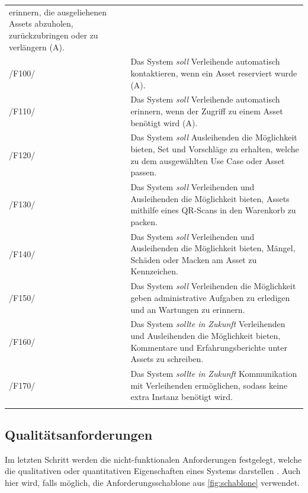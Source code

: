 \begin{center}
\begin{longtable}{lp{}}
                 erinnern, die ausgeliehenen Assets abzuholen, zurückzubringen oder zu verlängern
                 (A). \\
                 \sffamily\color{maincolor}/F100/  & Das System \textit{soll} Verleihende automatisch
                 kontaktieren, wenn ein Asset reserviert wurde (A). \\
                 \sffamily\color{maincolor}/F110/  & Das System \textit{soll} Verleihende automatisch
                 erinnern, wenn der Zugriff zu einem Asset benötigt wird (A). \\
                 \sffamily\color{maincolor}/F120/  & Das System \textit{soll} Ausleihenden die
                 Möglichkeit bieten, Set und Vorschläge zu erhalten, welche zu dem ausgewählten Use
                 Case oder Asset passen. \\
                 \sffamily\color{maincolor}/F130/ & Das System \textit{soll} Verleihenden und
                 Ausleihenden die Möglichkeit bieten, Assets mithilfe eines QR-Scans in den
                 Warenkorb zu packen. \\
                 \sffamily\color{maincolor}/F140/  & Das System \textit{soll} Verleihenden und
                 Ausleihenden die Möglichkeit bieten, Mängel, Schäden oder Macken am Asset zu
                 Kennzeichen. \\
                 \sffamily\color{maincolor}/F150/ & Das System \textit{soll} Verleihenden die
                 Möglichkeit geben administrative Aufgaben zu erledigen und an Wartungen zu erinnern.\\
                 \sffamily\color{maincolor}/F160/  & Das System \textit{sollte in Zukunft}
                 Verleihenden und Ausleihenden die Möglichkeit bieten, Kommentare und
                 Erfahrungsberichte unter Assets zu schreiben. \\
                 \sffamily\color{maincolor}/F170/ & Das System \textit{sollte in Zukunft}
                 Kommunikation mit Verleihenden ermöglichen, sodass keine extra Instanz benötigt
                 wird. \\
                \arrayrulecolor{maincolor}\hline
        \end{longtable}
\end{center}

\vspace*{-1.5cm}
\subsection{Qualitätsanforderungen}
\label{section:qualität}
Im letzten Schritt werden die nicht-funktionalen Anforderungen festgelegt, welche die qualitativen
oder quantitativen Eigenschaften eines Systems darstellen \cite{balzert2009}. Auch hier wird, falls
möglich, die Anforderungsschablone aus \ref{fig:schablone} verwendet.

